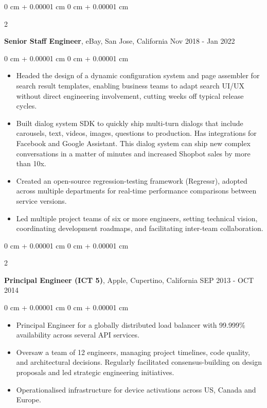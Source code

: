 \documentclass[10pt, letterpaper]{article}
\newenvironment{highlights}{
    \begin{itemize}[
        topsep=0.10 cm,
        parsep=0.10 cm,
        partopsep=0pt,
        itemsep=0pt,
        leftmargin=0 cm + 10pt
    ]
}{
    \end{itemize}
} %
\newenvironment{onecolentry}{
    \begin{adjustwidth}{
        0 cm + 0.00001 cm
    }{
        0 cm + 0.00001 cm
    }
}{
    \end{adjustwidth}
} %
\newenvironment{twocolentry}[2][]{
    \onecolentry
    \def\secondColumn{#2}
    \setcolumnwidth{\fill, 4.5 cm}
    \begin{paracol}{2}
}{
    \switchcolumn \raggedleft \secondColumn
    \end{paracol}
    \endonecolentry
} %
\begin{document}
        \vspace{0.15 cm}
        \begin{twocolentry}{
            Nov 2018 - Jan 2022
        }
            \textbf{Senior Staff Engineer}, eBay, San Jose, California\end{twocolentry}
        \vspace{0.10 cm}
        \begin{onecolentry}
            \begin{highlights}
                \item Headed the design of a dynamic configuration system and page assembler for search result templates, enabling business teams to adapt search UI/UX without direct engineering involvement, cutting weeks off typical release cycles.
                \item Built dialog system SDK to quickly ship multi-turn dialogs that include carousels, text, videos, images, questions to production. Has integrations for Facebook and Google Assistant. This dialog system can ship new complex conversations in a matter of minutes and increased Shopbot sales by more than 10x.
                \item Created an open-source regression-testing framework (Regressr), adopted across multiple departments for real-time performance comparisons between service versions.
                \item Led multiple project teams of six or more engineers, setting technical vision, coordinating development roadmaps, and facilitating inter-team collaboration.
            \end{highlights}
        \end{onecolentry}

        \vspace{0.15 cm}
        \begin{twocolentry}{
            SEP 2013 - OCT 2014
        }
            \textbf{Principal Engineer (ICT 5)}, Apple, Cupertino, California\end{twocolentry}
        \vspace{0.10 cm}
        \begin{onecolentry}
            \begin{highlights}
                \item Principal Engineer for a globally distributed load balancer with 99.999\% availability across several API services.
                \item Oversaw a team of 12 engineers, managing project timelines, code quality, and architectural decisions. Regularly facilitated consensus-building on design proposals and led strategic engineering initiatives.
                \item Operationalised infrastructure for device activations across US, Canada and Europe.
            \end{highlights}
        \end{onecolentry}
\end{document}
